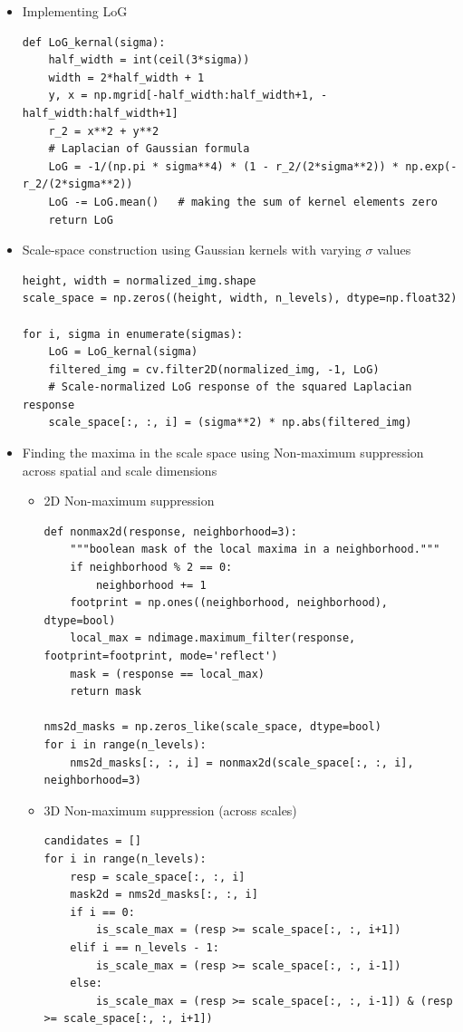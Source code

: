 \documentclass[9pt]{article}
\begin{document}
\begin{itemize}
    \item Implementing LoG
\begin{lstlisting}
def LoG_kernal(sigma):
    half_width = int(ceil(3*sigma))
    width = 2*half_width + 1
    y, x = np.mgrid[-half_width:half_width+1, -half_width:half_width+1]
    r_2 = x**2 + y**2
    # Laplacian of Gaussian formula
    LoG = -1/(np.pi * sigma**4) * (1 - r_2/(2*sigma**2)) * np.exp(-r_2/(2*sigma**2))
    LoG -= LoG.mean()   # making the sum of kernel elements zero
    return LoG
\end{lstlisting}
    \item Scale-space construction using Gaussian kernels with varying $\sigma$ values
\begin{lstlisting}
height, width = normalized_img.shape
scale_space = np.zeros((height, width, n_levels), dtype=np.float32)

for i, sigma in enumerate(sigmas):
    LoG = LoG_kernal(sigma)
    filtered_img = cv.filter2D(normalized_img, -1, LoG)
    # Scale-normalized LoG response of the squared Laplacian response
    scale_space[:, :, i] = (sigma**2) * np.abs(filtered_img)
\end{lstlisting}
    \item Finding the maxima in the scale space using Non-maximum suppression across spatial and scale dimensions
    \begin{itemize}
        \item 2D Non-maximum suppression
\begin{lstlisting}
def nonmax2d(response, neighborhood=3):
    """boolean mask of the local maxima in a neighborhood."""
    if neighborhood % 2 == 0:
        neighborhood += 1
    footprint = np.ones((neighborhood, neighborhood), dtype=bool)
    local_max = ndimage.maximum_filter(response, footprint=footprint, mode='reflect')
    mask = (response == local_max)
    return mask

nms2d_masks = np.zeros_like(scale_space, dtype=bool)
for i in range(n_levels):
    nms2d_masks[:, :, i] = nonmax2d(scale_space[:, :, i], neighborhood=3)

\end{lstlisting}
        \item 3D Non-maximum suppression (across scales)
\begin{lstlisting}
candidates = []
for i in range(n_levels):
    resp = scale_space[:, :, i]
    mask2d = nms2d_masks[:, :, i]
    if i == 0:
        is_scale_max = (resp >= scale_space[:, :, i+1])
    elif i == n_levels - 1:
        is_scale_max = (resp >= scale_space[:, :, i-1])
    else:
        is_scale_max = (resp >= scale_space[:, :, i-1]) & (resp >= scale_space[:, :, i+1])
        

\end{lstlisting}
\end{itemize}
\end{itemize}
\end{document}
